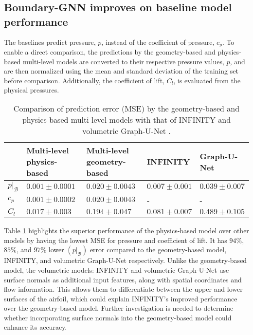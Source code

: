 \documentclass{marine_2025_paper_template}
\begin{document}
\subsection{Boundary-GNN improves on baseline model performance}

The baselines predict pressure, $p$, instead of the coefficient of pressure, $c_p$. To enable a direct comparison, the predictions by the geometry-based and physics-based multi-level models are converted to their respective pressure values, $p$, and are then normalized using the mean and standard deviation of the training set before comparison. Additionally, the coefficient of lift, $C_l$, is evaluated from the physical pressures.

\begin{table}[b]
\centering
\caption{Comparison of prediction error (MSE) by the geometry-based and physics-based multi-level models with that of INFINITY \citep{serrano2023} and volumetric Graph-U-Net \citep{bonnet2023}.}
\label{tab:baseline_comparison}
\begin{tabular}{| >{\raggedright\arraybackslash}p{0.7cm} | >{\raggedright\arraybackslash}p{4.3cm} | >{\raggedright\arraybackslash}p{4.3cm} | >{\raggedright\arraybackslash}p{2.7cm} | >{\raggedright\arraybackslash}p{2.7cm} |}
\hline

& {Multi-level physics-based} & {Multi-level geometry-based} & {INFINITY} & {Graph-U-Net} \\

\hline

$p|_{\mathcal{B}}$ & $\mathbf{0.001} \pm \mathbf{0.0001} $ &  $0.020 \pm 0.0043 $ & $0.007 \pm 0.001$ & $0.039 \pm 0.007$ \\ \hline

$c_p$ & $\mathbf{0.001} \pm \mathbf{0.0002} $ & $0.020 \pm 0.0043$ & - & -\\ \hline

$C_l$ & $\mathbf{0.017} \pm \mathbf{0.003} $ & $0.194 \pm 0.047$ & $0.081 \pm 0.007$ & $0.489 \pm 0.105 $\\ \hline

\hline
\end{tabular}
\end{table}

Table \ref{tab:baseline_comparison} highlights the superior performance of the physics-based model over other models by having the lowest MSE for pressure and coefficient of lift. It has $94\%$, $85\%$, and $97\%$ lower $(p|_{\mathcal{B}})$ error compared to the geometry-based model, INFINITY, and volumetric Graph-U-Net respectively. Unlike the geometry-based model, the volumetric models: INFINITY and volumetric Graph-U-Net use surface normals as additional input features, along with spatial coordinates and flow information. This allows them to differentiate between the upper and lower surfaces of the airfoil, which could explain INFINITY’s improved performance over the geometry-based model. Further investigation is needed to determine whether incorporating surface normals into the geometry-based model could enhance its accuracy.
\end{document}
